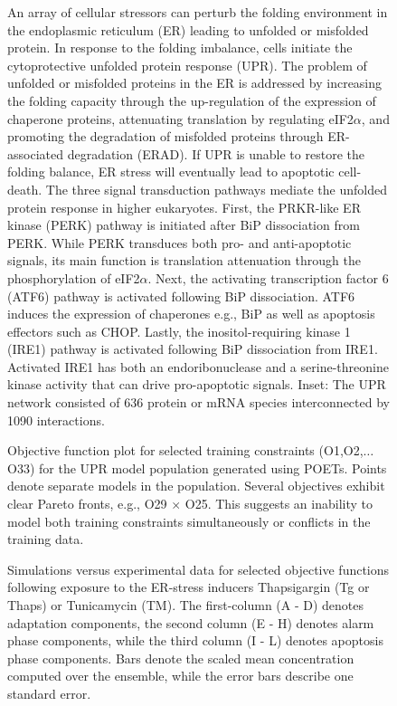 \documentclass[fleqn,10pt]{wlscirep}
\begin{document}
\begin{figure}\centering
{}
	\caption{An array of cellular stressors can perturb the folding environment in the endoplasmic reticulum (ER) leading to unfolded or misfolded protein. In response to the folding imbalance, cells initiate the cytoprotective unfolded protein response (UPR). The problem of unfolded or misfolded proteins in the ER is addressed by increasing the folding capacity through the up-regulation of the expression of chaperone proteins, attenuating translation by regulating eIF2$\alpha$, and promoting the degradation of misfolded proteins through ER-associated degradation (ERAD). If UPR is unable to restore the folding balance, ER stress will eventually lead to apoptotic cell-death. The three signal transduction pathways mediate the unfolded protein response in higher eukaryotes. First, the PRKR-like ER kinase (PERK) pathway is initiated after BiP dissociation from PERK. While PERK transduces both pro- and anti-apoptotic signals, its main function is translation attenuation through the phosphorylation of eIF2$\alpha$. Next, the activating transcription factor 6 (ATF6) pathway is activated following BiP dissociation. ATF6 induces the expression of chaperones e.g., BiP as well as apoptosis effectors such as CHOP. Lastly, the inositol-requiring kinase 1 (IRE1) pathway is activated following BiP dissociation from IRE1. Activated IRE1 has both an endoribonuclease and a serine-threonine kinase activity that can drive pro-apoptotic signals. Inset: The UPR network consisted of 636 protein or mRNA species interconnected by 1090 interactions.}
	\label{fg:fig1}
\end{figure}

\begin{figure}\centering
{}
	\caption{Objective function plot for selected training constraints (O1,O2,$\hdots$O33) for the UPR model population generated using POETs. Points denote separate models in the population. Several objectives exhibit clear Pareto fronts, e.g., O29 $\times$ O25. This suggests an inability to model both training constraints simultaneously or conflicts in the training data.}
	\label{fg:objective_plot}
\end{figure}

\begin{figure}\centering
{}
	\caption{Simulations versus experimental data for selected objective functions following exposure to the ER-stress inducers Thapsigargin (Tg or Thaps) or Tunicamycin (TM). The first-column (A - D) denotes adaptation components, the second column (E - H) denotes alarm phase components, while the third column (I - L) denotes apoptosis phase components. Bars denote the scaled mean concentration computed over the ensemble, while the error bars describe one standard error.}
	\label{fg:simulation_comparison}
\end{figure}
\end{document}
